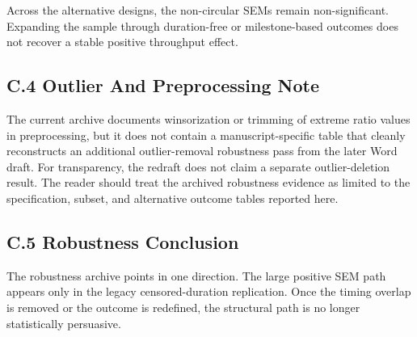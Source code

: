 \documentclass[
  letterpaper,
]{article}
\begin{document}
Across the alternative designs, the non-circular SEMs remain
non-significant. Expanding the sample through duration-free or
milestone-based outcomes does not recover a stable positive throughput
effect.

\subsection{C.4 Outlier And Preprocessing
Note}\label{c.4-outlier-and-preprocessing-note}

The current archive documents winsorization or trimming of extreme ratio
values in preprocessing, but it does not contain a manuscript-specific
table that cleanly reconstructs an additional outlier-removal robustness
pass from the later Word draft. For transparency, the redraft does not
claim a separate outlier-deletion result. The reader should treat the
archived robustness evidence as limited to the specification, subset,
and alternative outcome tables reported here.

\subsection{C.5 Robustness Conclusion}\label{c.5-robustness-conclusion}

The robustness archive points in one direction. The large positive SEM
path appears only in the legacy censored-duration replication. Once the
timing overlap is removed or the outcome is redefined, the structural
path is no longer statistically persuasive.
\end{document}
